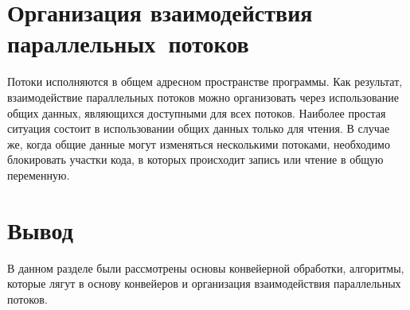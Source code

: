 \section{Организация взаимодействия \hbox{параллельных потоков}}
Потоки исполняются в общем адресном пространстве программы. Как результат, взаимодействие параллельных потоков можно организовать через использование общих данных, являющихся доступными для всех потоков. Наиболее простая ситуация состоит в использовании общих данных только для чтения. В случае же, когда общие данные могут изменяться несколькими потоками, необходимо блокировать участки кода, в которых происходит запись или чтение в общую переменную. 
\section*{Вывод}
В данном разделе были рассмотрены основы конвейерной обработки, алгоритмы, которые лягут в основу конвейеров и
организация взаимодействия параллельных потоков.